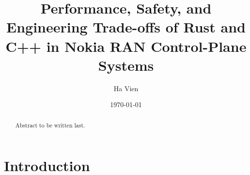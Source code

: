 \documentclass[english,twoside,openright,a4paper,censored,csm,software-track-2020]{HYthesisML}
\title{Performance, Safety, and Engineering Trade-offs of Rust and C++ in Nokia RAN Control-Plane Systems}
\author{Ha Vien}
\date{\today}
\begin{document}
\maketitle


{\singlespacing
\begin{otherlanguage}{english}
\begin{abstract}
\noindent Abstract to be written last.
\end{abstract}
\end{otherlanguage}
}

\mytableofcontents

\mainmatter

\chapter{Introduction}
\end{document}

